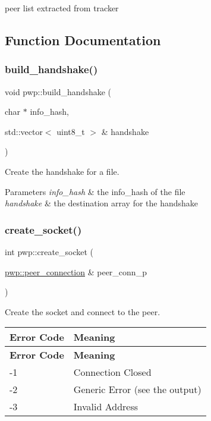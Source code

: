 peer list extracted from tracker 

\subsection{Function Documentation}
\mbox{\label{namespacepwp_a6062876f4d4d4d6ee19341a79a797864}} 
\subsubsection{\texorpdfstring{build\+\_\+handshake()}{build\_handshake()}}
{\footnotesize\ttfamily void pwp\+::build\+\_\+handshake (\begin{DoxyParamCaption}\item[{char $\ast$}]{info\+\_\+hash,  }\item[{std\+::vector$<$ uint8\+\_\+t $>$ \&}]{handshake }\end{DoxyParamCaption})}



Create the handshake for a file. 


\begin{DoxyParams}{Parameters}
{\em info\+\_\+hash} & the info\+\_\+hash of the file \\
\hline
{\em handshake} & the destination array for the handshake \\
\hline
\end{DoxyParams}
\mbox{\label{namespacepwp_a73acf05b954e39825a88036d5793db6b}} 
\subsubsection{\texorpdfstring{create\+\_\+socket()}{create\_socket()}}
{\footnotesize\ttfamily int pwp\+::create\+\_\+socket (\begin{DoxyParamCaption}\item[{\hyperlink{structpwp_1_1peer__connection}{pwp\+::peer\+\_\+connection} \&}]{peer\+\_\+conn\+\_\+p }\end{DoxyParamCaption})}



Create the socket and connect to the peer. 

\tabulinesep=1mm
\begin{longtabu} spread 0pt [c]{*{2}{|X[-1]}|}
\hline
\rowcolor{\tableheadbgcolor}\textbf{ Error Code }&\textbf{ Meaning  }\\
\endfirsthead
\hline
\endfoot
\hline
\rowcolor{\tableheadbgcolor}\textbf{ Error Code }&\textbf{ Meaning  }\\
\endhead
-\/1 &Connection Closed \\
-\/2 &Generic Error (see the output) \\
-\/3 &Invalid Address \\
\end{longtabu}



